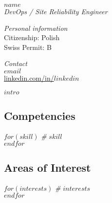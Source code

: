 \documentclass[$fontsize$, a4paper]{article}
\begin{document}

  {\LARGE $name$}\\[.2cm]
  {\large \textsl{DevOps / Site Reliability Engineer}}\\[.1cm]

\begin{multicols}{2}



\vspace{15pt}
\emph{Personal information}\\
Citizenship: Polish\\
Swiss Permit: B

\columnbreak

\vspace{15pt}
\emph{Contact}\\
\href{mailto:$email$}{$email$}\\
\href{http://linkedin.com/in/$linkedin$}{linkedin.com/in/$linkedin$}

\end{multicols}



$intro$



\begin{multicols}{2}

\subsection*{Competencies}
$for(skill)$
\emph{\#} \enspace $skill$\\
$endfor$

\columnbreak

\subsection*{Areas of Interest}
$for(interests)$
\emph{\#} \enspace $interests$\\
$endfor$

\end{multicols}


\end{document}
